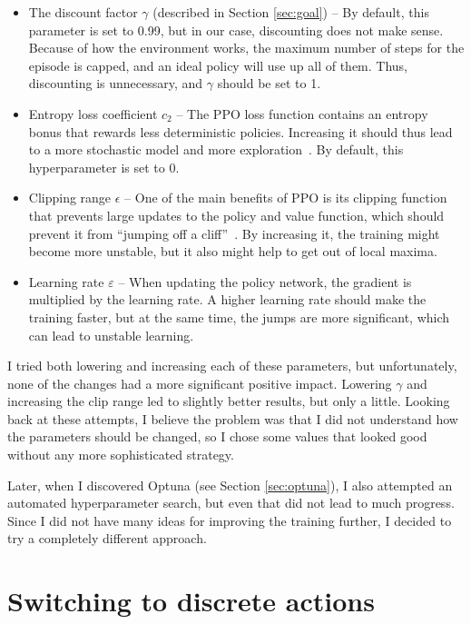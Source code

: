 \documentclass[
  digital,     %
  oneside,     %
  nosansbold,  %
  nocolorbold, %
  lof,         %
  lot,         %
]{fithesis4}
\begin{document}
\begin{itemize}
    \item The discount factor $\gamma$ (described in Section \ref{sec:goal}) -- By default, this parameter is set to 0.99, but in our case, discounting does not make sense. Because of how the environment works, the maximum number of steps for the episode is capped, and an ideal policy will use up all of them. Thus, discounting is unnecessary, and $\gamma$ should be set to 1.
    \item Entropy loss coefficient $c_2$ -- The PPO loss function contains an entropy bonus that rewards less deterministic policies. Increasing it should thus lead to a more stochastic model and more exploration~\cite{PPO_paper}. By default, this hyperparameter is set to 0.
    \item Clipping range $\epsilon$ -- One of the main benefits of PPO is its clipping function that prevents large updates to the policy and value function, which should prevent it from \enquote{jumping off a cliff}~\cite{PPO_paper}. By increasing it, the training might become more unstable, but it also might help to get out of local maxima.
    \item Learning rate $\varepsilon$ -- When updating the policy network, the gradient is multiplied by the learning rate. A higher learning rate should make the training faster, but at the same time, the jumps are more significant, which can lead to unstable learning.
\end{itemize}

I tried both lowering and increasing each of these parameters, but unfortunately, none of the changes had a more significant positive impact. Lowering $\gamma$ and increasing the clip range led to slightly better results, but only a little. Looking back at these attempts, I believe the problem was that I did not understand how the parameters should be changed, so I chose some values that looked good without any more sophisticated strategy.

Later, when I discovered Optuna (see Section \ref{sec:optuna}), I also attempted an automated hyperparameter search, but even that did not lead to much progress. Since I did not have many ideas for improving the training further, I decided to try a completely different approach.

\section{Switching to discrete actions}
\label{sec:iterative}
\end{document}
